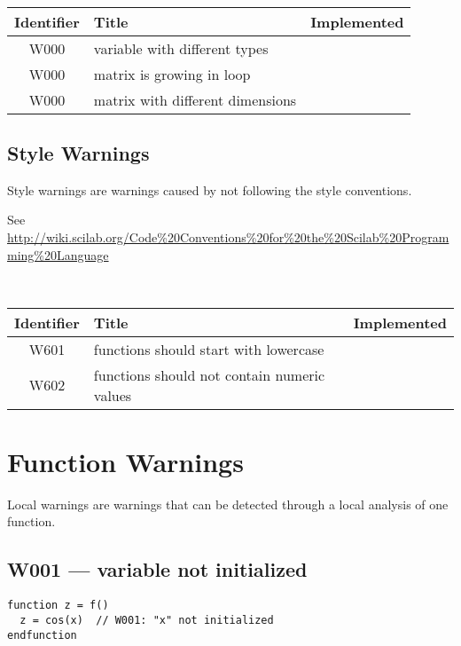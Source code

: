 \noindent\\\begin{tabular}{|c|p{8cm}|c|} \hline
Identifier & Title & Implemented      \\ \hline
W000 & variable with different types &  \\ \hline
W000 & matrix is growing in loop &  \\ \hline
W000 & matrix with different dimensions &  \\ \hline
\end{tabular}

\subsection{Style Warnings}



Style warnings are warnings caused by not following the style conventions.



See \url{http://wiki.scilab.org/Code%20Conventions%20for%20the%20Scilab%20Programming%20Language}



\noindent\\\begin{tabular}{|c|p{8cm}|c|} \hline
Identifier & Title & Implemented      \\ \hline
W601 & functions should start with lowercase &  \\ \hline
W602 & functions should not contain numeric values &  \\ \hline
\end{tabular}

\section{Function Warnings}



Local warnings are warnings that can be detected through a local analysis of
one function.



\subsection{W001 --- variable not initialized}


\begin{verbatim}
function z = f()
  z = cos(x)  // W001: "x" not initialized
endfunction
\end{verbatim}



